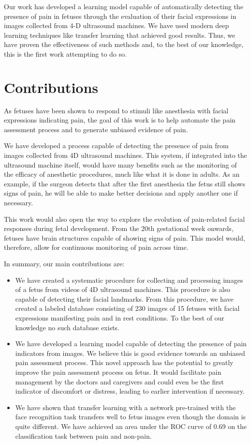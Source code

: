 Our work has developed a learning model capable of automatically detecting the presence of pain in fetuses through the evaluation of their facial expressions in images collected from 4-D ultrasound machines. We have used modern deep learning techniques like transfer learning that achieved good results. Thus, we have proven the effectiveness of such methods and, to the best of our knowledge, this is the first work attempting to do so.

\section{Contributions}

As fetuses have been shown to respond to stimuli like anesthesia with facial expressions indicating pain, the goal of this work is to help automate the pain assessment process and to generate unbiased evidence of pain. 

We have developed a process capable of detecting the presence of pain from images collected from 4D ultrasound machines. This system, if integrated into the ultrasound machine itself, would  have many benefits such as the monitoring of the efficacy of anesthetic procedures, much like what it is done in adults. As an example, if the surgeon detects that after the first anesthesia the fetus still shows signs of pain, he will be able to make better decisions and apply another one if necessary.

This work would also open the way to explore the evolution of pain-related facial responses during fetal development. From the 20th gestational week onwards, fetuses have brain structures capable of showing signs of pain. This model would, therefore, allow for continuous monitoring of pain across time.

In summary, our main contributions are:

\begin{itemize}
    \item We have created a systematic procedure for collecting and processing images of a fetus from videos of 4D ultrasound machines. This procedure is also capable of detecting their facial landmarks. From this procedure, we have created a labeled database consisting of 230 images of 15 fetuses with facial expressions manifesting pain and in rest conditions. To the best of our knowledge no such database exists.
    \item We have developed a learning model capable of detecting the presence of pain indicators from images. We believe this is good evidence towards an unbiased pain assessment process. This novel approach has the potential to greatly improve the pain assessment process on fetus. It would facilitate pain management by the doctors and caregivers and could even be the first indicator of discomfort or distress, leading to earlier intervention if necessary.
    \item We have shown that transfer learning with a network pre-trained with the face recognition task transfers well to fetus images even though the domain is quite different. We have achieved an area under the ROC curve of 0.69 on the classification task between pain and non-pain.
\end{itemize}

